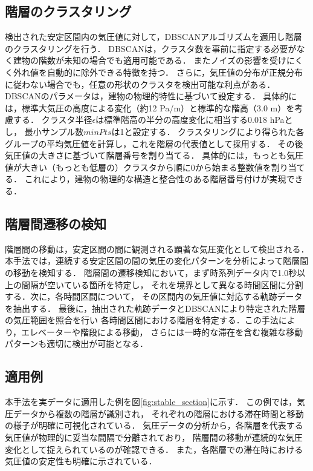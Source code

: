 \subsection{階層のクラスタリング}
検出された安定区間内の気圧値に対して，DBSCANアルゴリズムを適用し階層のクラスタリングを行う．
DBSCANは，クラスタ数を事前に指定する必要がなく建物の階数が未知の場合でも適用可能である．
またノイズの影響を受けにくく外れ値を自動的に除外できる特徴を持つ．
さらに，気圧値の分布が正規分布に従わない場合でも，任意の形状のクラスタを検出可能な利点がある．
DBSCANのパラメータは，建物の物理的特性に基づいて設定する．
具体的には，標準大気圧の高度による変化（約12 Pa/m）と標準的な階高（3.0 m）を考慮する．
クラスタ半径$\epsilon$は標準階高の半分の高度変化に相当する0.018 hPaとし，
最小サンプル数$minPts$は1と設定する．
クラスタリングにより得られた各グループの平均気圧値を計算し，これを階層の代表値として採用する．
その後気圧値の大きさに基づいて階層番号を割り当てる．
具体的には，もっとも気圧値が大きい（もっとも低層の）クラスタから順に0から始まる整数値を割り当てる．
これにより，建物の物理的な構造と整合性のある階層番号付けが実現できる．

\subsection{階層間遷移の検知}
階層間の移動は，安定区間の間に観測される顕著な気圧変化として検出される．
本手法では，連続する安定区間の間の気圧の変化パターンを分析によって階層間の移動を検知する．
階層間の遷移検知において，まず時系列データ内で1.0秒以上の間隔が空いている箇所を特定し，
それを境界として異なる時間区間に分割する．次に，各時間区間について，
その区間内の気圧値に対応する軌跡データを抽出する．
最後に，抽出された軌跡データとDBSCANにより特定された階層の気圧範囲を照合を行い
各時間区間における階層を特定する．この手法により，エレベーターや階段による移動，
さらには一時的な滞在を含む複雑な移動パターンも適切に検出が可能となる．

\subsection{適用例}
本手法を実データに適用した例を図\ref{fig:stable_section}に示す．
この例では，気圧データから複数の階層が識別され，
それぞれの階層における滞在時間と移動の様子が明確に可視化されている．
気圧データの分析から，各階層を代表する気圧値が物理的に妥当な間隔で分離されており，
階層間の移動が連続的な気圧変化として捉えられているのが確認できる．
また，各階層での滞在時における気圧値の安定性も明確に示されている．


